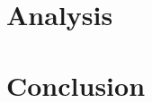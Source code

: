 \documentclass[11pt]{article}
\begin{document}
\section{Analysis}
\label{sec:analysis}

\section{Conclusion}
\label{sec:conclusion}



\end{document}
